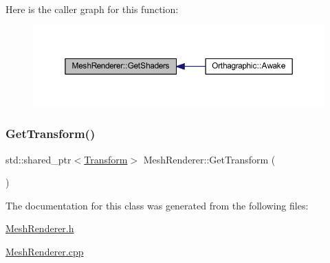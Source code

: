 Here is the caller graph for this function\+:
\nopagebreak
\begin{figure}[H]
\begin{center}
\leavevmode
\includegraphics[width=350pt]{class_mesh_renderer_a07be90e4601d54e0870854cc91dc018c_icgraph}
\end{center}
\end{figure}
\mbox{\label{class_mesh_renderer_a89beac4cf0a91a275686c5f5507af465}} 
\subsubsection{\texorpdfstring{Get\+Transform()}{GetTransform()}}
{\footnotesize\ttfamily std\+::shared\+\_\+ptr$<$\mbox{\hyperlink{class_transform}{Transform}}$>$ Mesh\+Renderer\+::\+Get\+Transform (\begin{DoxyParamCaption}{ }\end{DoxyParamCaption})\hspace{0.3cm}{\ttfamily [inline]}}



The documentation for this class was generated from the following files\+:\begin{DoxyCompactItemize}
\item 
\mbox{\hyperlink{_mesh_renderer_8h}{Mesh\+Renderer.\+h}}\item 
\mbox{\hyperlink{_mesh_renderer_8cpp}{Mesh\+Renderer.\+cpp}}\end{DoxyCompactItemize}
